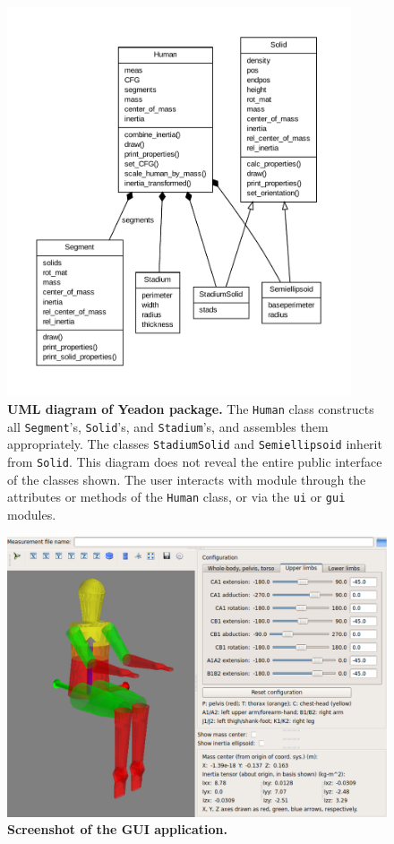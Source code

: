 \documentclass[10pt]{article}
\begin{document}
\begin{figure}[!ht]
  \begin{center}
    \includegraphics[width=4in]{figfactory/umldiagram/umldiagram.pdf}
  \end{center}
  \cprotect\caption{
    {\bf UML diagram of Yeadon package.}
    The \verb+Human+ class constructs all \verb+Segment+'s, \verb+Solid+'s, and
    \verb+Stadium+'s, and assembles them appropriately. The classes
    \verb+StadiumSolid+ and \verb+Semiellipsoid+ inherit from \verb+Solid+.
    This diagram does not reveal the entire public interface of the classes
    shown. The user interacts with module through the attributes or methods of
    the \verb+Human+ class, or via the \verb+ui+ or \verb+gui+ modules.
  }
  \label{fig:umldiagram}
\end{figure}

\begin{figure}[!ht]
  \begin{center}
    \includegraphics[width=6in]{figfactory/gui-screenshot.png}
  \end{center}
  \caption{
    {\bf Screenshot of the GUI application.}
  }
  \label{fig:gui}
\end{figure}
\end{document}
